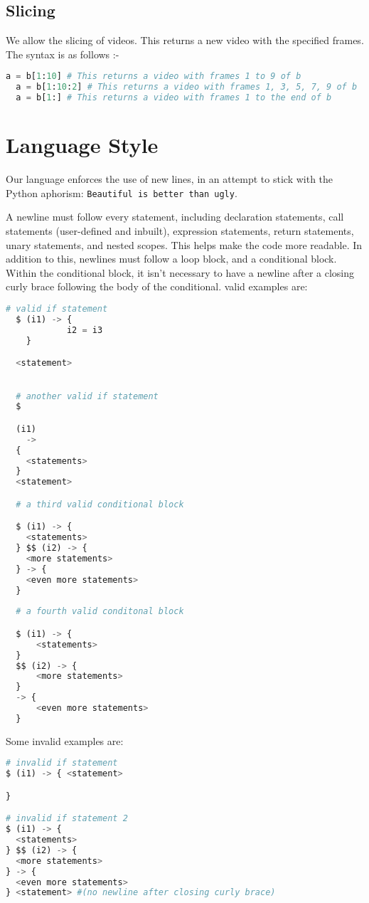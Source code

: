 \documentclass[a4paper, 11pt]{article}
\begin{document}
    \subsection{Slicing}
  We allow the slicing of videos. This returns a new video with the specified frames. The syntax is as follows :-
  \begin{lstlisting}[language=Python]
  a = b[1:10] # This returns a video with frames 1 to 9 of b
  a = b[1:10:2] # This returns a video with frames 1, 3, 5, 7, 9 of b
  a = b[1:] # This returns a video with frames 1 to the end of b\end{lstlisting}





\section{Language Style}
Our language enforces the use of new lines, in an attempt to stick with the Python aphorism: \texttt{Beautiful is better than ugly}.

A newline must follow every statement, including declaration statements, call statements (user-defined and inbuilt), expression statements, return statements,
unary statements, and nested scopes. This helps make the code more readable. In addition to this, newlines must follow a loop block, and a conditional block. Within the conditional block, it isn't necessary to have a newline after a closing curly brace following the body of the conditional.
valid examples are: 
\begin{lstlisting}[language=Python]
  # valid if statement
  $ (i1) -> { 
			i2 = i3
	} 

  <statement>

  
  # another valid if statement 
  $ 

  (i1)
    ->
  {
    <statements>
  } 
  <statement>

  # a third valid conditional block

  $ (i1) -> { 
    <statements>
  } $$ (i2) -> {
    <more statements>
  } -> {
    <even more statements>
  }
  
  # a fourth valid conditonal block

  $ (i1) -> { 
      <statements>
  } 
  $$ (i2) -> {
      <more statements> 
  }
  -> {
      <even more statements>
  } \end{lstlisting}

Some invalid examples are:
\begin{lstlisting}[language=Python]
# invalid if statement
$ (i1) -> { <statement>

}

# invalid if statement 2
$ (i1) -> {
  <statements> 
} $$ (i2) -> {
  <more statements>
} -> {
  <even more statements>
} <statement> #(no newline after closing curly brace)
\end{lstlisting}
\end{document}
